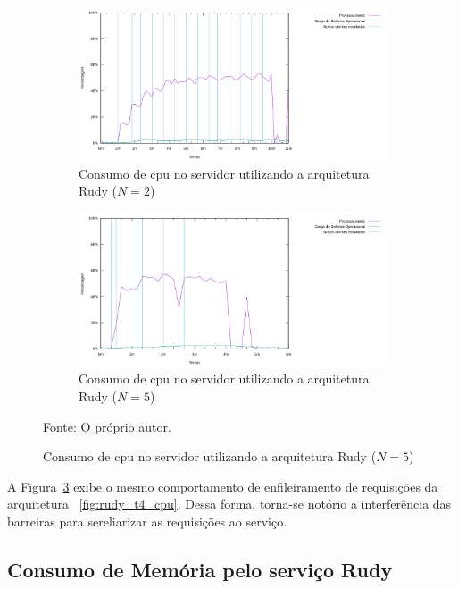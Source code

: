 \begin{figure}[htb!]
    \caption{Consumo de \ac{cpu} no servidor utilizando a arquitetura Rudy ($N=2$ e $N=5$)}
    \centering
    \begin{subfigure}{1.0\textwidth}
      \centering
      \includegraphics[width=.9\textwidth]{metricas_rudy_t5/cpu.png}
      \caption{Consumo de \ac{cpu} no servidor utilizando a arquitetura Rudy ($N=2$)}
      \label{fig:rudy_t5_cpu}
    \end{subfigure}


    \begin{subfigure}{1.0\textwidth}
      \centering
      \includegraphics[width=.9\textwidth]{metricas_rudy_t6/cpu.png}
      \caption{Consumo de \ac{cpu} no servidor utilizando a arquitetura Rudy ($N=5$)}
      \label{fig:rudy_t6_cpu}
    \end{subfigure}
    \label{fig:rudy_t56_cpu}

    Fonte: O próprio autor.
\end{figure}

A Figura~\ref{fig:rudy_t56_cpu} exibe o mesmo comportamento de enfileiramento de requisições da arquitetura ~\ref{fig:rudy_t4_cpu}.
%
Dessa forma, torna-se notório a interferência das barreiras para sereliarizar as requisições ao serviço.
%


\subsection{Consumo de Memória pelo serviço Rudy}

